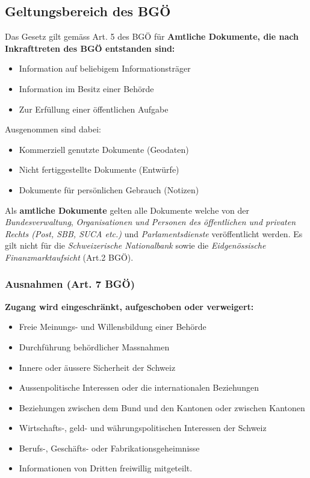 \subsection{Geltungsbereich des BGÖ}
\label{sec:BGO-Geltungsbereich}

Das Gesetz gilt gemäss Art. 5 des BGÖ für \textbf{Amtliche Dokumente, die nach
Inkrafttreten des BGÖ entstanden sind:}
\begin{itemize}
	\tightlist
	\item Information auf beliebigem Informationsträger
	\item Information im Besitz einer Behörde
	\item Zur Erfüllung einer öffentlichen Aufgabe
\end{itemize}

Ausgenommen sind dabei:
\begin{itemize}
	\tightlist
	\item Kommerziell genutzte Dokumente (Geodaten)
	\item Nicht fertiggestellte Dokumente (Entwürfe)
	\item Dokumente für persönlichen Gebrauch (Notizen)
\end{itemize}

Als \textbf{amtliche Dokumente} gelten alle Dokumente welche von der
\textit{Bundesverwaltung}, \textit{Organisationen und Personen des öffentlichen
und privaten Rechts (Post, SBB, SUCA etc.)} und \textit{Parlamentsdienste}
veröffentlicht werden. Es gilt nicht für die \textit{Schweizerische Nationalbank}
sowie die \textit{Eidgenössische Finanzmarktaufsicht} (Art.2 BGÖ).

\subsubsection{Ausnahmen (Art. 7 BGÖ)}
\label{sec:BGO-Ausnahmen}
\textbf{Zugang wird eingeschränkt, aufgeschoben oder verweigert:}
\begin{itemize}
	\tightlist
	\item Freie Meinungs- und Willensbildung einer Behörde
	\item Durchführung behördlicher Massnahmen
	\item Innere oder äussere Sicherheit der Schweiz
	\item Aussenpolitische Interessen oder die internationalen Beziehungen
	\item Beziehungen zwischen dem Bund und den Kantonen oder zwischen Kantonen
	\item Wirtschafts-, geld- und währungspolitischen Interessen der Schweiz
	\item Berufs-, Geschäfts- oder Fabrikationsgeheimnisse
	\item Informationen von Dritten freiwillig mitgeteilt.
\end{itemize}

